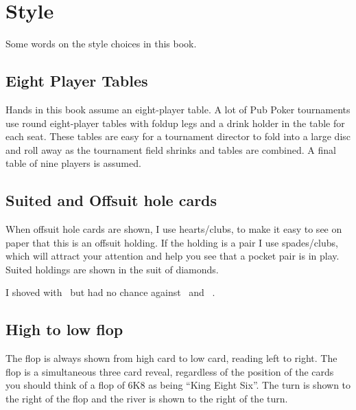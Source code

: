 \chapter{Style}


Some words on the style choices in this book.

\section*{Eight Player Tables}

Hands in this book assume an eight-player table. A lot of Pub
Poker tournaments use round eight-player tables with foldup legs and a
drink holder in the table for each seat. These tables are easy for a
tournament director to fold into a large disc and roll away as the
tournament field shrinks and tables are combined. A final table of
nine players is assumed.

\section*{Suited and Offsuit hole cards}

When offsuit hole cards are shown, I use hearts/clubs, to make
it easy to see on paper that this is an offsuit holding. If the
holding is a pair I use spades/clubs, which will
attract your attention and help you see that a pocket pair is in play.
Suited holdings are shown in the suit of diamonds.

I shoved with \Ah\tenc\ but had no chance against \Ad\Kd\ and \Js\Jc\ .



\section*{High to low flop}

The flop is always shown from high card to low card, reading left to
right. The flop is a simultaneous three card reveal, regardless of the
position of the cards you should think of a flop of 6K8 as being
``King Eight Six''. The turn is shown to the right of the flop and the
river is shown to the right of the turn.

